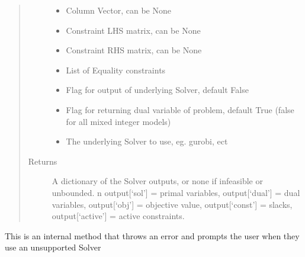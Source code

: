 \documentclass[letterpaper,10pt,english]{sphinxmanual}
\begin{document}
\begin{fulllineitems}
\begin{quote}
\begin{description}
\begin{itemize}
\item {} 
\sphinxAtStartPar
{} \textendash{} Column Vector, can be None

\item {} 
\sphinxAtStartPar
{} \textendash{} Constraint LHS matrix, can be None

\item {} 
\sphinxAtStartPar
{} \textendash{} Constraint RHS matrix, can be None

\item {} 
\sphinxAtStartPar
{} \textendash{} List of Equality constraints

\item {} 
\sphinxAtStartPar
{} \textendash{} Flag for output of underlying Solver, default False

\item {} 
\sphinxAtStartPar
{} \textendash{} Flag for returning dual variable of problem, default True (false for all mixed integer models)

\item {} 
\sphinxAtStartPar
{} \textendash{} The underlying Solver to use, eg. gurobi, ect

\end{itemize}

\item[{Returns}] \leavevmode
\sphinxAtStartPar
A dictionary of the Solver outputs, or none if infeasible or unbounded. n output{[}‘sol’{]} = primal variables, output{[}‘dual’{]} = dual variables, output{[}‘obj’{]} = objective value, output{[}‘const’{]} = slacks, output{[}‘active’{]} = active constraints.

\end{description}\end{quote}

\end{fulllineitems}


\begin{fulllineitems}
\label{\detokenize{mpo.solver_interface:mpo.solver_interface.solver_interface.solver_not_supported}}
\sphinxAtStartPar
This is an internal method that throws an error and prompts the user when they use an unsupported Solver

\end{fulllineitems}
\end{document}

